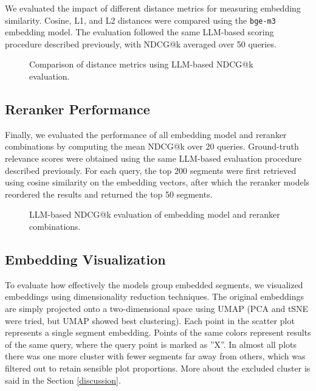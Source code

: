 \documentclass[conference]{IEEEtran}
\begin{document}
We evaluated the impact of different distance metrics for measuring embedding similarity. Cosine, L1, and L2 distances were compared using the \texttt{bge-m3} embedding model. The evaluation followed the same LLM-based scoring procedure described previously, with NDCG@k averaged over 50 queries.

\begin{figure}[ht]
    \centering
    
    \caption{Comparison of distance metrics using LLM-based NDCG@k evaluation.}
    \label{fig:metric_comparison}
\end{figure}






\subsection{Reranker Performance}

Finally, we evaluated the performance of all embedding model and reranker combinations by computing the mean NDCG@k over 20 queries. Ground-truth relevance scores were obtained using the same LLM-based evaluation procedure described previously. For each query, the top 200 segments were first retrieved using cosine similarity on the embedding vectors, after which the reranker models reordered the results and returned the top 50 segments.

\begin{figure}[ht]
    \centering
    
    \caption{LLM-based NDCG@k evaluation of embedding model and reranker combinations.}
    \label{fig:reranker_comparison}
\end{figure}





\subsection{Embedding Visualization}


To evaluate how effectively the models group embedded segments, we visualized embeddings using dimensionality reduction techniques. The original embeddings are simply projected onto a two-dimensional space using UMAP (PCA and tSNE were tried, but UMAP showed best clustering). Each point in the scatter plot represents a single segment embedding. Points of the same colors represent results of the same query, where the query point is marked as ''X''. In almost all plots there was one more cluster with fewer segments far away from others, which was filtered out to retain sensible plot proportions. More about the excluded cluster is said in the Section \ref{discussion}. 
\end{document}

